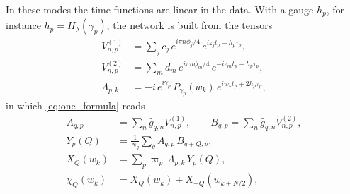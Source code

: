 \documentclass[aps,prb,reprint,a4paper]{revtex4-2}
\begin{document}
In these modes the time functions are linear in the data. With a gauge $h_p$, for instance $h_p=H_\lambda(\gamma_p)$, the network is built from the tensors
\begin{equation}
  \begin{aligned}
  V^{(1)}_{n,p}&=\sum_jc_j\,e^{i\pi n\phi_j/4}\,e^{iz_jt_p-h_p\tau_p},\\
  V^{(2)}_{n,p}&=\sum_md_m\,e^{i\pi n\phi_m/4}\,e^{-iz_mt_p-h_p\tau_p},\\
  \Lambda_{p,k}&=-i\,e^{i\gamma_p}\,P_{\gamma_p}(w_k)\,e^{iw_kt_p+2h_p\tau_p},
  \end{aligned}
  \label{eq:vandermonde}
\end{equation}
in which \eqref{eq:one_formula} reads
\begin{equation}
  \begin{aligned}
  A_{q,p}&=\sum_n\hat g_{q,n}V^{(1)}_{n,p},\qquad B_{q,p}=\sum_n\hat g_{q,n}V^{(2)}_{n,p},\\
  Y_p(Q)&=\frac1{N_q}\sum_qA_{q,p}\,B_{q+Q,p},\\
  X_Q(w_k)&=\sum_p\varpi_p\,\Lambda_{p,k}\,Y_p(Q),\\
  \chi_Q(w_k)&=X_Q(w_k)+X_{-Q}(w_{k+N/2}),
  \end{aligned}
  \label{eq:time_nodes}
\end{equation}
\end{document}
